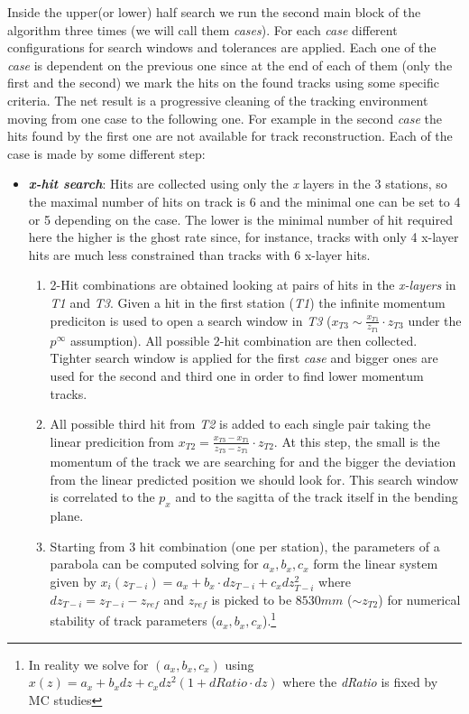 \documentclass[paper=a4, fontsize=10pt]{scrartcl}
\numberwithin{equation}{section}		%
\numberwithin{figure}{section}			%
\numberwithin{table}{section}				%
\begin{document}
Inside the upper(or lower) half search we run the second main block of the algorithm three times (we will call them \textit{cases}). For each \textit{case} different configurations for search windows and tolerances are applied. Each one of the \textit{case} is dependent on the previous one since at the end of each of them (only the first and the second) we mark the hits on the found tracks using some specific criteria. The net result is a progressive cleaning of the tracking environment moving from one case to the following one. For example in the second \textit{case} the hits found by the first one are not available for track reconstruction.
Each of the case is made by some different step:
\begin{itemize}
  \item{\textbf{\textit{x-hit search}}: Hits are collected using only the \textit{x} layers in the 3 stations, so the maximal number of hits on track is 6 and the minimal one can be set to 4 or 5 depending on the case. The lower is the minimal number of hit required here the higher is the ghost rate since, for instance, tracks with only 4 x-layer hits are much less constrained than tracks with 6 x-layer hits.}
    \begin{enumerate}
    \item{2-Hit combinations are obtained looking at pairs of hits in the \textit{x-layers} in \textit{T1} and \textit{T3}. Given a hit in the first station (\textit{T1}) the infinite momentum prediciton is used to open a search window in \textit{T3} ($x_{T3} \sim \frac{x_{T1}}{z_{T1}}\cdot z_{T3}$ under the $p^{ \infty }$ assumption). All possible 2-hit combination are then collected. Tighter search window is applied for the first \textit{case} and bigger ones are used for the second and third one in order to find lower momentum tracks.}
      \item{All possible third hit from \textit{T2} is added to each single pair taking the linear predicition from $x_{T2} = \frac{x_{T3}-x_{T1}}{z_{T3}-z_{T1}}\cdot z_{T2}$. At this step, the small is the momentum of the track we are searching for and the bigger the deviation from the linear predicted position we should look for. This search window is correlated to the $p_{x}$ and to the sagitta of the track itself in the bending plane.}
      \item{Starting from 3 hit combination (one per station), the parameters of a parabola can be computed solving for $a_{x},b_x,c_x$ form the linear system given by $x_{i}(z_{T-i})= a_{x}+b_{x}\cdot dz_{T-i}+c_{x}dz_{T-i}^{2}$ where $dz_{T-i} = z_{T-i}-z_{ref}$ and $z_{ref}$ is picked to be $8530 mm$ ($\sim z_{T2}$) for numerical stability of track parameters ($a_{x},b_{x},c_{x}$).\footnote{In reality we solve for $(a_{x},b_{x},c_{x})$ using $x(z)=a_{x}+b_{x}dz+c_{x}dz^{2}(1+dRatio\cdot dz)$ where the \textit{dRatio} is fixed by MC studies}}

\end{enumerate}
\end{itemize}
\end{document}
